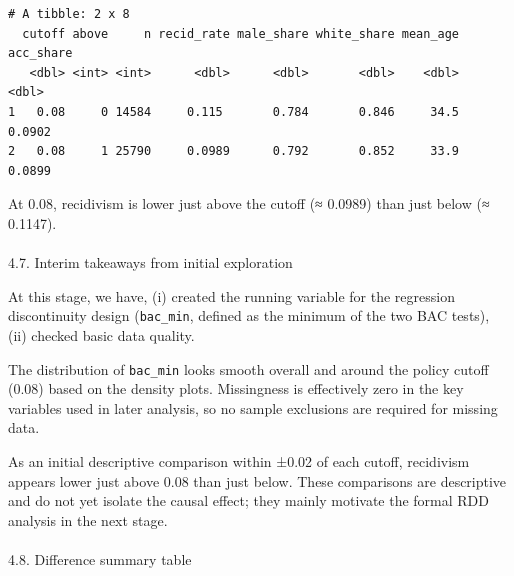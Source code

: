 \documentclass[
  letterpaper,
  DIV=11,
  numbers=noendperiod]{scrartcl}
\makeatletter
\let\oldparagraph\paragraph
\renewcommand{\paragraph}{
    \@ifstar
      \xxxParagraphStar
      \xxxParagraphNoStar
  }
\newcommand{\xxxParagraphStar}[1]{\oldparagraph*{#1}\mbox{}}
\newcommand{\xxxParagraphNoStar}[1]{\oldparagraph{#1}\mbox{}}
\makeatother
\begin{document}
\begin{verbatim}
# A tibble: 2 x 8
  cutoff above     n recid_rate male_share white_share mean_age acc_share
   <dbl> <int> <int>      <dbl>      <dbl>       <dbl>    <dbl>     <dbl>
1   0.08     0 14584     0.115       0.784       0.846     34.5    0.0902
2   0.08     1 25790     0.0989      0.792       0.852     33.9    0.0899
\end{verbatim}

At 0.08, recidivism is lower just above the cutoff (≈ 0.0989) than just
below (≈ 0.1147).

\paragraph{4.7. Interim takeaways from initial
exploration}\label{interim-takeaways-from-initial-exploration}

At this stage, we have, (i) created the running variable for the
regression discontinuity design (\texttt{bac\_min}, defined as the
minimum of the two BAC tests), (ii) checked basic data quality.

The distribution of \texttt{bac\_min} looks smooth overall and around
the policy cutoff (0.08) based on the density plots. Missingness is
effectively zero in the key variables used in later analysis, so no
sample exclusions are required for missing data.

As an initial descriptive comparison within ±0.02 of each cutoff,
recidivism appears lower just above 0.08 than just below. These
comparisons are descriptive and do not yet isolate the causal effect;
they mainly motivate the formal RDD analysis in the next stage.

\paragraph{4.8. Difference summary
table}\label{difference-summary-table}
\end{document}
